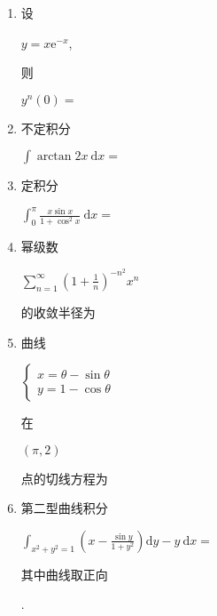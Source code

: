 \documentclass[10pt]{article}
\begin{document}
\begin{enumerate}
  \item \begin{CJK}{UTF8}{mj}设\end{CJK} $y=x \mathrm{e}^{-x}$, \begin{CJK}{UTF8}{mj}则\end{CJK} $y^{n}(0)=$

  \item \begin{CJK}{UTF8}{mj}不定积分\end{CJK} $\int \arctan 2 x \mathrm{~d} x=$

  \item \begin{CJK}{UTF8}{mj}定积分\end{CJK} $\int_{0}^{\pi} \frac{x \sin x}{1+\cos ^{2} x} \mathrm{~d} x=$

  \item \begin{CJK}{UTF8}{mj}幂级数\end{CJK} $\sum_{n=1}^{\infty}\left(1+\frac{1}{n}\right)^{-n^{2}} x^{n}$ \begin{CJK}{UTF8}{mj}的收敛半径为\end{CJK}

  \item \begin{CJK}{UTF8}{mj}曲线\end{CJK} $\left\{\begin{array}{l}x=\theta-\sin \theta \\ y=1-\cos \theta\end{array}\right.$ \begin{CJK}{UTF8}{mj}在\end{CJK} $(\pi, 2)$ \begin{CJK}{UTF8}{mj}点的切线方程为\end{CJK}

  \item \begin{CJK}{UTF8}{mj}第二型曲线积分\end{CJK} $\int_{x^{2}+y^{2}=1}\left(x-\frac{\sin y}{1+y^{2}}\right) \mathrm{d} y-y \mathrm{~d} x=$ \begin{CJK}{UTF8}{mj}其中曲线取正向\end{CJK}.

\end{enumerate}
\end{document}
